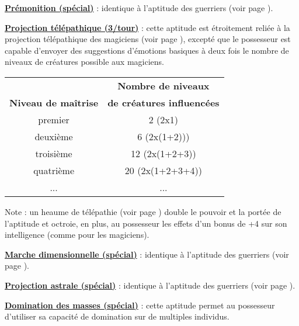 \bigskip

\textbf{\uline{Prémonition (spécial)}} : identique à l'aptitude des guerriers (voir page \pageref{guerrier-premonition}).

\bigskip

\textbf{\uline{Projection télépathique (3/tour)}} : cette aptitude est étroitement reliée à la projection télépathique des magiciens (voir page \pageref{magicien-projection-telepathique}), excepté que le possesseur est capable d'envoyer des suggestions d'émotions basiques à deux fois le nombre de niveaux de créatures possible aux magiciens.

\bigskip

\begin{tabular}{cc}
                                &\textbf{Nombre de niveaux} \\
\textbf{Niveau de maîtrise}      & \textbf{de créatures influencées}\\
premier     & 2 (2x1)            \\
deuxième    & 6 (2x(1+2)))       \\
troisième   & 12 (2x(1+2+3))     \\
quatrième   & 20 (2x(1+2+3+4))   \\
...         & ...           \\
\end{tabular}

\bigskip

Note : un heaume de télépathie (voir page \pageref{objet-heaume-telepathie}) double le pouvoir et la portée de l'aptitude et octroie, en plus, au possesseur les effets d'un bonus de +4 sur son intelligence (comme pour les magiciens).

\bigskip

\textbf{\uline{Marche dimensionnelle (spécial)}} : identique à l'aptitude des guerriers (voir page \pageref{guerrier-marche-dimensionnelle}).

\bigskip

\textbf{\uline{Projection astrale (spécial)}} : identique à l'aptitude des guerriers (voir page \pageref{magicien-projection-astrale}).

\bigskip

\textbf{\uline{Domination des masses (spécial)}} : cette aptitude permet au possesseur d'utiliser sa capacité de domination sur de multiples individus.

\bigskip

